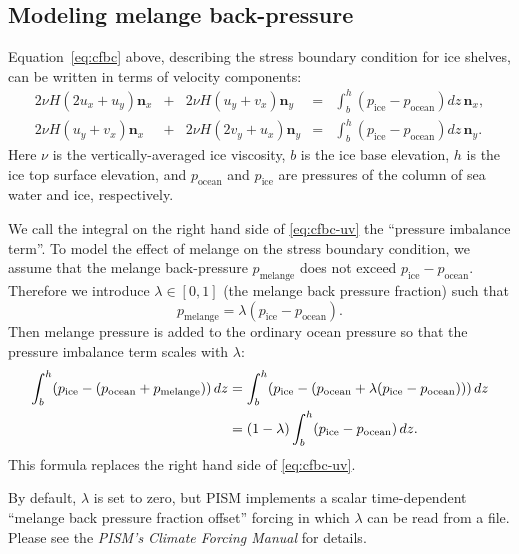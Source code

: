 \subsection{Modeling melange back-pressure}
\label{sec:model-melange-pressure}

Equation~\eqref{eq:cfbc} above, describing the stress boundary condition for ice shelves, can be written in terms of velocity components:
\newcommand{\psw}{p_{\text{ocean}}}
\newcommand{\pice}{p_{\text{ice}}}
\newcommand{\pmelange}{p_{\text{melange}}}
\newcommand{\n}{\mathbf{n}}
\newcommand{\nx}{\n_{x}}
\newcommand{\ny}{\n_{y}}
\begin{equation}
  \label{eq:cfbc-uv}
  \begin{array}{lclcl}
    2 \nu H (2u_x + u_y) \nx &+& 2 \nu H (u_y + v_x)  \ny &=& \displaystyle \int_{b}^{h}(\pice - \psw) dz\, \nx,\\
    2 \nu H (u_y + v_x)  \nx &+& 2 \nu H (2v_y + u_x) \ny &=& \displaystyle \int_{b}^{h}(\pice - \psw) dz\, \ny.
  \end{array}
\end{equation}
Here $\nu$ is the vertically-averaged ice viscosity, $b$ is the ice base elevation, $h$ is the ice top surface elevation, and $\psw$ and $\pice$ are pressures of the column of sea water and ice, respectively.

We call the integral on the right hand side of \eqref{eq:cfbc-uv} the ``pressure imbalance term''.  To model the effect of melange \cite{Amundsonetal2010} on the stress boundary condition, we assume that the melange back-pressure $\pmelange$ does not exceed $\pice - \psw$.  Therefore we introduce $\lambda \in [0,1]$ (the melange back pressure fraction) such that
\begin{equation*}
  \pmelange = \lambda (\pice - \psw).
\end{equation*}
Then melange pressure is added to the ordinary ocean pressure so that the pressure imbalance term scales with $\lambda$:
\begin{align}
\int_{b}^{h}(\pice - (\psw + \pmelange))\, dz &= \int_{b}^{h}(\pice - (\psw + \lambda(\pice - \psw)))\, dz \notag \\
&= (1 - \lambda) \int_{b}^{h} (\pice - \psw)\, dz.  \label{eq:cfbc-3}
\end{align}
This formula replaces the right hand side of \eqref{eq:cfbc-uv}.

By default, $\lambda$ is set to zero, but PISM implements a scalar time-dependent ``melange back pressure fraction offset'' forcing in which $\lambda$ can be read from a file.  Please see the \emph{PISM's Climate Forcing Manual} for details.


